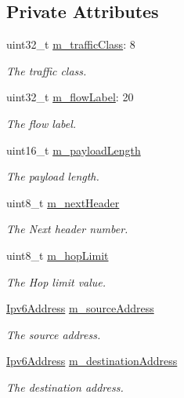 \subsection*{Private Attributes}
\begin{DoxyCompactItemize}
\item 
uint32\+\_\+t \hyperlink{classns3_1_1Ipv6Header_aec156ee7eaef08d6fdb38f028a32747e}{m\+\_\+traffic\+Class}\+: 8
\begin{DoxyCompactList}\small\item\em The traffic class. \end{DoxyCompactList}\item 
uint32\+\_\+t \hyperlink{classns3_1_1Ipv6Header_a612e380567f73ca30f8bc975b286b0b7}{m\+\_\+flow\+Label}\+: 20
\begin{DoxyCompactList}\small\item\em The flow label. \end{DoxyCompactList}\item 
uint16\+\_\+t \hyperlink{classns3_1_1Ipv6Header_a8f7c17fc4a76bb3fd7b314f89dd16da0}{m\+\_\+payload\+Length}
\begin{DoxyCompactList}\small\item\em The payload length. \end{DoxyCompactList}\item 
uint8\+\_\+t \hyperlink{classns3_1_1Ipv6Header_a9fcad57248a77bd54e75d381b551907a}{m\+\_\+next\+Header}
\begin{DoxyCompactList}\small\item\em The Next header number. \end{DoxyCompactList}\item 
uint8\+\_\+t \hyperlink{classns3_1_1Ipv6Header_af75e22e0fe94f2408f000956ee435b9e}{m\+\_\+hop\+Limit}
\begin{DoxyCompactList}\small\item\em The Hop limit value. \end{DoxyCompactList}\item 
\hyperlink{classns3_1_1Ipv6Address}{Ipv6\+Address} \hyperlink{classns3_1_1Ipv6Header_a89d6831bbc4f59d25e0f5f569b95573e}{m\+\_\+source\+Address}
\begin{DoxyCompactList}\small\item\em The source address. \end{DoxyCompactList}\item 
\hyperlink{classns3_1_1Ipv6Address}{Ipv6\+Address} \hyperlink{classns3_1_1Ipv6Header_a3b160d334b4cb93cec9e209a815735c4}{m\+\_\+destination\+Address}
\begin{DoxyCompactList}\small\item\em The destination address. \end{DoxyCompactList}\end{DoxyCompactItemize}
